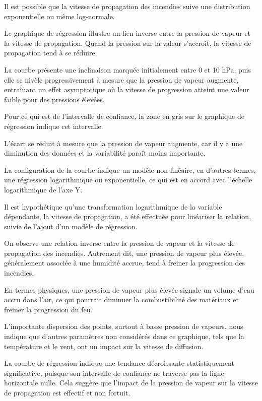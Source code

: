 \documentclass[
]{article}
\begin{document}
Il est possible que la vitesse de propagation des incendies suive une
distribution exponentielle ou même log-normale.

Le graphique de régression illustre un lien inverse entre la pression de
vapeur et la vitesse de propagation. Quand la pression sur la valeur
s'accroît, la vitesse de propagation tend à se réduire.

La courbe présente une inclinaison marquée initialement entre 0 et 10
hPa, puis elle se nivèle progressivement à mesure que la pression de
vapeur augmente, entraînant un effet asymptotique où la vitesse de
progression atteint une valeur faible pour des pressions élevées.

Pour ce qui est de l'intervalle de confiance, la zone en gris sur le
graphique de régression indique cet intervalle.

L'écart se réduit à mesure que la pression de vapeur augmente, car il y
a une diminution des données et la variabilité paraît moins importante.

La configuration de la courbe indique un modèle non linéaire, en
d'autres termes, une régression logarithmique ou exponentielle, ce qui
est en accord avec l'échelle logarithmique de l'axe Y.

Il est hypothétique qu'une transformation logarithmique de la variable
dépendante, la vitesse de propagation, a été effectuée pour linéariser
la relation, suivie de l'ajout d'un modèle de régression.

On observe une relation inverse entre la pression de vapeur et la
vitesse de propagation des incendies. Autrement dit, une pression de
vapeur plus élevée, généralement associée à une humidité accrue, tend à
freiner la progression des incendies.

En termes physiques, une pression de vapeur plus élevée signale un
volume d'eau accru dans l'air, ce qui pourrait diminuer la
combustibilité des matériaux et freiner la progression du feu.

L'importante dispersion des points, surtout à basse pression de vapeurs,
nous indique que d'autres paramètres non considérés dans ce graphique,
tels que la température et le vent, ont un impact sur la vitesse de
diffusion.

La courbe de régression indique une tendance décroissante
statistiquement significative, puisque son intervalle de confiance ne
traverse pas la ligne horizontale nulle. Cela suggère que l'impact de la
pression de vapeur sur la vitesse de propagation est effectif et non
fortuit.
\end{document}
